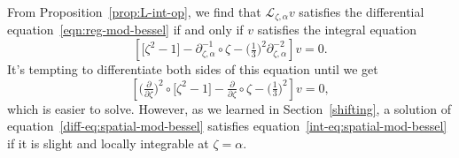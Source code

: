 \documentclass{article}
\newcommand{\fracderiv}[3]{\partial^{#1}_{#2, #3}}
\newcommand{\laplace}{\mathcal{L}}
\theoremstyle{definition}
\theoremstyle{plain}
\begin{document}
From Proposition~\ref{prop:L-int-op}, we find that $\laplace_{\zeta, \alpha} v$ satisfies the differential equation~\eqref{eqn:reg-mod-bessel} if and only if $v$ satisfies the integral equation
\begin{equation}\label{int-eq:spatial-mod-bessel}
\left[ \big[ \zeta^2 - 1 \big] - \fracderiv{-1}{\zeta}{\alpha} \circ \zeta - \big(\tfrac{1}{3}\big)^2 \fracderiv{-2}{\zeta}{\alpha} \right] v = 0.
\end{equation}
It's tempting to differentiate both sides of this equation until we get
\begin{equation}\label{diff-eq:spatial-mod-bessel}
\left[ \big(\tfrac{\partial}{\partial \zeta}\big)^2 \circ \big[ \zeta^2 - 1 \big] - \tfrac{\partial}{\partial \zeta} \circ \zeta - \big(\tfrac{1}{3}\big)^2 \right] v = 0,
\end{equation}
which is easier to solve. However, as we learned in Section~\ref{shifting}, a solution of equation~\eqref{diff-eq:spatial-mod-bessel} satisfies equation~\eqref{int-eq:spatial-mod-bessel} if it is slight and locally integrable at $\zeta = \alpha$. 
\end{document}

